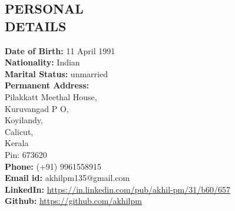 \documentclass[line,margin]{res}
\begin{document}
\begin{resume}
    \section{PERSONAL \\ DETAILS}
	    {\bf Date of Birth:} 11 April 1991\\
	    {\bf Nationality:} Indian\\
	    {\bf Marital Status:} unmarried\\
	    {\bf Permanent Address:} \\
	    Pilakkatt Meethal House,\\
	    Kuruvangad P O,\\
	    Koyilandy,\\
	    Calicut,\\
		Kerala\\
	    Pin: 673620\\
	    {\bf Phone:} (+91) 9961558915 \\
	    {\bf Email id:} akhilpm135@gmail.com\\
	    {\bf LinkedIn:} \url{https://in.linkedin.com/pub/akhil-pm/31/b60/657}\\
	    {\bf Github:} \url{https://github.com/akhilpm}
\end{resume}
\end{document}
